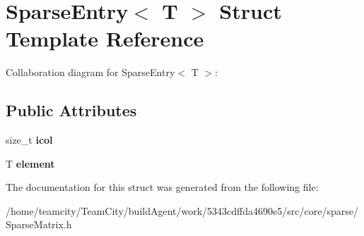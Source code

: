 \hypertarget{structSparseEntry}{}\section{Sparse\+Entry$<$ T $>$ Struct Template Reference}
\label{structSparseEntry}


Collaboration diagram for Sparse\+Entry$<$ T $>$\+:
\subsection*{Public Attributes}
\begin{DoxyCompactItemize}
\item 
size\+\_\+t {\bfseries icol}\hypertarget{structSparseEntry_a4d2f28eb765872b70a420f16394eb2f4}{}\label{structSparseEntry_a4d2f28eb765872b70a420f16394eb2f4}

\item 
T {\bfseries element}\hypertarget{structSparseEntry_a9dec94fc6dfd9a4f0d5f46b85fb885ba}{}\label{structSparseEntry_a9dec94fc6dfd9a4f0d5f46b85fb885ba}

\end{DoxyCompactItemize}


The documentation for this struct was generated from the following file\+:\begin{DoxyCompactItemize}
\item 
/home/teamcity/\+Team\+City/build\+Agent/work/5343cdffda4690e5/src/core/sparse/Sparse\+Matrix.\+h\end{DoxyCompactItemize}
